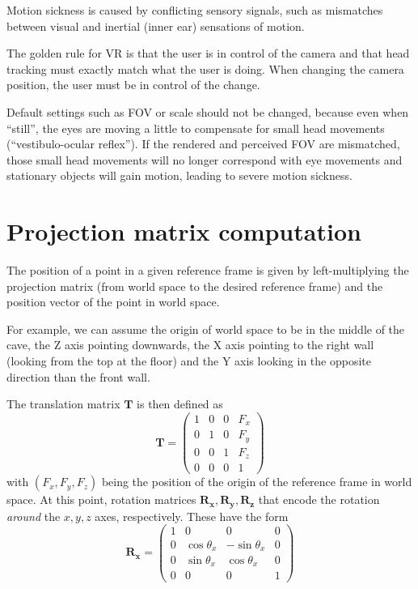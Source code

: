 \documentclass[a4paper]{article}
\begin{document}
Motion sickness is caused by conflicting sensory signals, such as
mismatches between visual and inertial (inner ear) sensations of motion.

The golden rule for VR is that the user is in control of the camera and
that head tracking must exactly match what the user is doing.
When
changing the camera position, the user must be in control of the change.

Default settings such as FOV or scale should not be changed, because
even when ``still'', the eyes are moving a little to compensate for
small head movements (``vestibulo-ocular reflex'').
If the rendered and
perceived FOV are mismatched, those small head movements will no longer
correspond with eye movements and stationary objects will gain motion,
leading to severe motion sickness.

\section{Projection matrix computation}

The position of a point in a given reference frame is given by
left-multiplying the projection matrix (from world space to the desired
reference frame) and the position vector of the point in world space.

For example, we can assume the origin of world space to be in the middle
of the cave, the Z axis pointing downwards, the X axis pointing to the
right wall (looking from the top at the floor) and the Y axis looking in
the opposite direction than the front wall.

The translation matrix \(\mathbf{T}\) is then defined as \[
\mathbf{T} = \begin{pmatrix}
1 & 0 & 0 & F_x \\
0 & 1 & 0 & F_y \\
0 & 0 & 1 & F_z \\
0 & 0 & 0 & 1
\end{pmatrix}
\] with \((F_x, F_y, F_z)\) being the position of the origin of the
reference frame in world space.
At this point, rotation matrices
\(\mathbf{R_x}, \mathbf{R_y}, \mathbf{R_z}\) that encode the rotation
\emph{around} the \(x, y, z\) axes, respectively.
These have the form \[
\mathbf{R_x} = \begin{pmatrix}
1 & 0 & 0 & 0 \\
0 & \cos \theta_x & -\sin \theta_x & 0 \\
0 & \sin \theta_x & \cos \theta_x & 0 \\
0 & 0 & 0 & 1
\end{pmatrix}
\]
\end{document}
